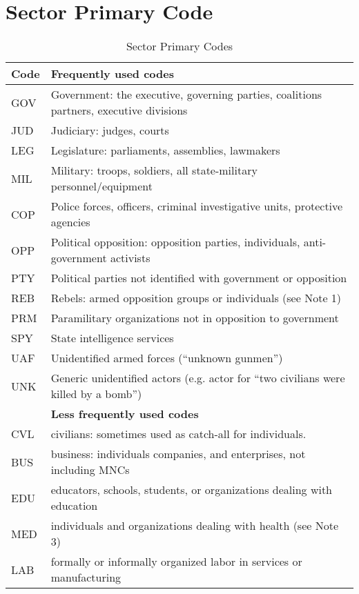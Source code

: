 \documentclass[11pt]{report}
\begin{document}
\newpage

\section{Sector Primary Code}

\begin{center}
\begin{longtable}{|l|p{13cm}|}
\caption{Sector Primary Codes}
\label{tab:roles}
 \\ \cline{1-2}
  \textbf{Code} & \textbf{Frequently used codes}\\
  \hline
	  GOV & Government: the executive, governing parties, coalitions partners, executive divisions \\
	  JUD & Judiciary: judges, courts \\
	  LEG & Legislature: parliaments, assemblies, lawmakers \\
	  MIL & Military: troops, soldiers, all state-military personnel/equipment\\
	  COP & Police forces, officers, criminal investigative units, protective agencies \\
	  OPP & Political opposition: opposition parties, individuals, anti-government activists \\
	  PTY & Political parties not identified with government or opposition \\
	  REB & Rebels: armed opposition groups or individuals (see Note 1)\\
	  PRM & Paramilitary organizations not in opposition to government\\
	  SPY & State intelligence services \\
	  UAF & Unidentified armed forces (``unknown gunmen'') \\
	  UNK & Generic unidentified actors (e.g. actor for ``two civilians were killed by a bomb'') \\
  \hline
~   & \textbf{Less frequently used codes}\\
 \hline
	  CVL & civilians: sometimes used as catch-all for individuals.  \\
	  BUS & business: individuals companies, and enterprises, not including MNCs \\
	  EDU & educators, schools, students, or organizations dealing with education \\
	  MED & individuals and organizations dealing with health (see Note 3) \\
	  LAB & formally or informally organized labor in services or manufacturing \\

\end{longtable}
\end{center}
\end{document}
